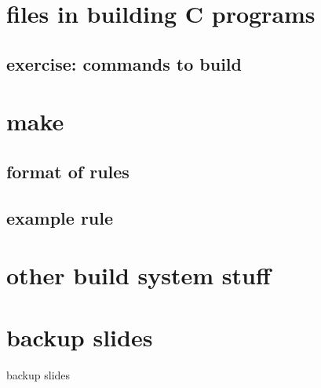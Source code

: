 \date{}
\title{}
\date{}

\begin{frame}
    \titlepage
\end{frame}

\section{files in building C programs}



\subsection{exercise: commands to build}



\section{make}

\subsection{format of rules}




\subsection{example rule}


\section{other build system stuff}



\section{backup slides}
\begin{frame}{backup slides}
\end{frame}


